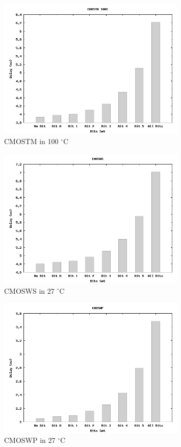 \documentclass[a4paper,12pt]{article} \usepackage{graphicx}
\newcommand{\degree}{\ensuremath{^\circ}}
\begin{document}
\begin{figure}[h!]
        \centering
        \includegraphics[width=0.8\textwidth]{../Bilder/Delay_Line/CMOSTM100.png}
        \caption{CMOSTM in 100 \degree C}
        \label{fig:CMOSTM100}
\end{figure}

\begin{figure}[h!]
        \centering
        \includegraphics[width=0.8\textwidth]{../Bilder/Delay_Line/CMOSWS.png}
        \caption{CMOSWS in 27 \degree C}
        \label{fig:CMOSWS}
\end{figure}

\begin{figure}[h!]
        \centering
        \includegraphics[width=0.8\textwidth]{../Bilder/Delay_Line/CMOSWP.png}
        \caption{CMOSWP in 27 \degree C}
        \label{fig:CMOSWP}
\end{figure}
\end{document}
